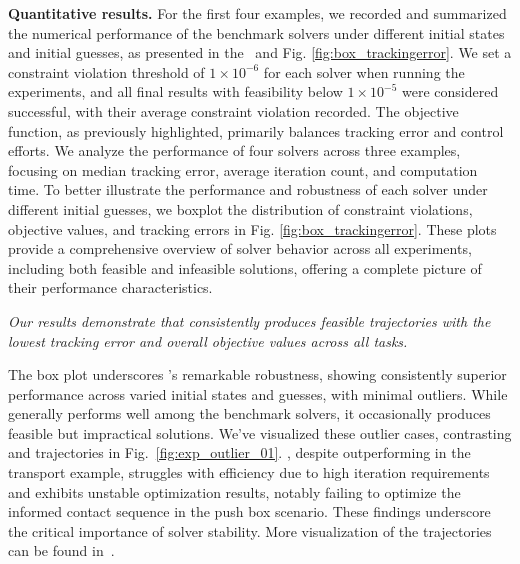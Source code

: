 \textbf{Quantitative results.}
For the first four examples, we recorded and summarized the numerical performance of the benchmark solvers under different initial states and initial guesses, as presented in the~ and Fig. \ref{fig:box_trackingerror}. We set a constraint violation threshold of $1 \times 10^{-6}$ for each solver when running the experiments, and all final results with feasibility below $1 \times 10^{-5}$ were considered successful, with their average constraint violation recorded.
The objective function, as previously highlighted, primarily balances tracking error and control efforts. We analyze the performance of four solvers across three examples, focusing on median tracking error, average iteration count, and computation time. To better illustrate the performance and robustness of each solver under different initial guesses, we boxplot the distribution of constraint violations, objective values, and tracking errors in Fig. \ref{fig:box_trackingerror}. These plots provide a comprehensive overview of solver behavior across all experiments, including both feasible and infeasible solutions, offering a complete picture of their performance characteristics.


\emph{Our results demonstrate that \crisp consistently produces feasible trajectories with the lowest tracking error and overall objective values across all tasks.} 

The box plot underscores \crisp's remarkable robustness, showing consistently superior performance across varied initial states and guesses, with minimal outliers. While \ipopt generally performs well among the benchmark solvers, it occasionally produces feasible but impractical solutions. We've visualized these outlier cases, contrasting \crisp and \ipopt trajectories in Fig.~\ref{fig:exp_outlier_01}. \snopt, despite outperforming \ipopt in the transport example, struggles with efficiency due to high iteration requirements and exhibits unstable optimization results, notably failing to optimize the informed contact sequence in the push box scenario. These findings underscore the critical importance of solver stability. More visualization of the trajectories can be found in~.

